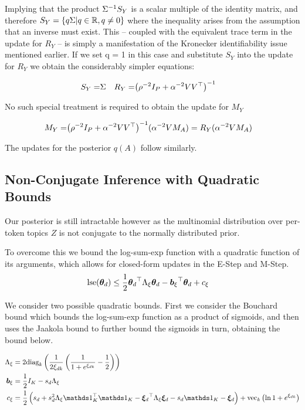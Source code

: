 Implying that the product ${\Sigma}^{-1} S_Y$ is a scalar multiple of the identity matrix, and therefore $S_Y = \{ q \Sigma | q \in { \mathbb{R} }, q \neq 0 \}$ where the inequality arises from the assumption that an inverse must exist. This -- coupled with the equivalent trace term in the update for $R_Y$ -- is simply a manifestation of the Kronecker identifiability issue mentioned earlier. If we set q = 1 in this case and substitute $S_Y$ into the update for $R_Y$ we obtain the considerably simpler equations:

\begin{align}
S_Y = & \Sigma &
R_Y = & {\left( \rho^{-2} I_P + \alpha^{-2}V V^\top \right)}^{-1}
\end{align}

No such special treatment is required to obtain the update for $M_Y$

\begin{align}
M_Y = & {\left( \rho^{-2} I_P + \alpha^{-2} V V^\top \right)}^{-1}(\alpha^{-2}V M_A) = R_Y (\alpha^{-2} V M_A)
\end{align}

The updates for the posterior $q(A)$ follow similarly.

\subsection{Non-Conjugate Inference with Quadratic Bounds}
Our posterior is still intractable however as the multinomial distribution over per-token topics $Z$ is not conjugate to the normally distributed prior.

To overcome this we bound the log-sum-exp function with a quadratic function of its arguments, which allows for closed-form updates in the E-Step and M-Step. 
\begin{align}
\text{lse}({ \bm \theta_d }) & \leq \frac{1}{2} { \bm \theta_d }^\top { \Lambda_{\xi} } {  \bm \theta _d } - { \bm b_{\xi} }^\top{  \bm \theta _d } + { c_{\xi} }
\end{align}

We consider two possible quadratic bounds. First we consider the Bouchard bound\cite{Bouchard2007} which bounds the log-sum-exp function as a product of sigmoids, and then uses the Jaakola bound\cite{Jaakkola1997} to further bound the sigmoids in turn, obtaining the bound below.

\begin{align}
\Axi & = 2 \text{diag}_k
    \left(
        \frac{1}{2\Edk}\left(\frac{1}{1 + e^{\Edk}} - \half\right)
    \right) \\
\bxi & = \half I_K - s_d \Axi \\
\cxi & = \half \left( s_d + s_d^2 \Axi \onek\T\onek - \Ed\T\Axi\Ed -  s_d \onek - \Ed\right) + \text{vec}_k\left({\ln 1+e^{\Edk}}\right)
\end{align} 

